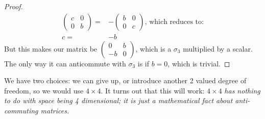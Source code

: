 \documentclass[]{article}
\begin{document}
\begin{proof}
\begin{align*}
\begin{pmatrix}
			c & 0\\
			0 & b
		\end{pmatrix} =& - \begin{pmatrix}
			b & 0\\
			0 & c
		\end{pmatrix} \text{, which reduces to:}\\
		c =& -b
	\end{align*}
	But this makes our matrix be $\begin{pmatrix}
		0 & b\\
		-b & 0
	\end{pmatrix}$, which is a $\sigma_3$ multiplied by a scalar. The only way it can anticommute with $\sigma_3$ is if $b=0$, which is trivial.
\end{proof}
We have two choices: we can give up, or introduce another 2 valued degree of freedom, so we would use $4 \times 4$. It turns out that this will work: $4 \times 4$ \emph{has nothing to do with space being 4 dimensional; it is just a mathematical fact about anti-commuting matrices.} 
\end{document}
